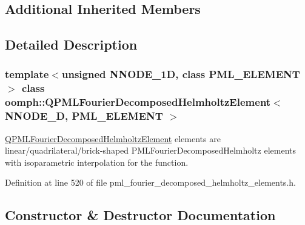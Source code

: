 \subsection*{Additional Inherited Members}


\subsection{Detailed Description}
\subsubsection*{template$<$unsigned N\+N\+O\+D\+E\+\_\+1D, class P\+M\+L\+\_\+\+E\+L\+E\+M\+E\+NT$>$\newline
class oomph\+::\+Q\+P\+M\+L\+Fourier\+Decomposed\+Helmholtz\+Element$<$ N\+N\+O\+D\+E\+\_\+D, P\+M\+L\+\_\+\+E\+L\+E\+M\+E\+N\+T $>$}

\hyperlink{classoomph_1_1QPMLFourierDecomposedHelmholtzElement}{Q\+P\+M\+L\+Fourier\+Decomposed\+Helmholtz\+Element} elements are linear/quadrilateral/brick-\/shaped P\+M\+L\+Fourier\+Decomposed\+Helmholtz elements with isoparametric interpolation for the function. 

Definition at line 520 of file pml\+\_\+fourier\+\_\+decomposed\+\_\+helmholtz\+\_\+elements.\+h.



\subsection{Constructor \& Destructor Documentation}
\mbox{\label{classoomph_1_1QPMLFourierDecomposedHelmholtzElement_aa52e9e6c4b94eba4f6ee1f79b1eca325}} 
